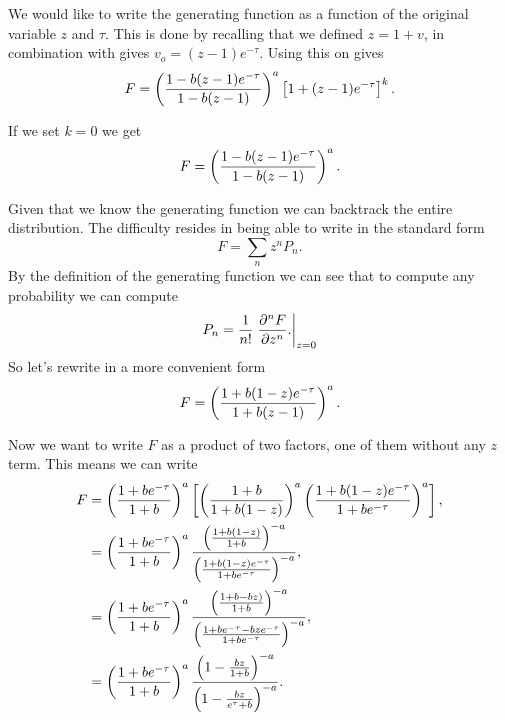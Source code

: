 We would like to write the generating function as a function of the original
variable $z$ and $\tau$. This is done by recalling that we defined $z = 1 + v$,
in combination with  gives $v_o = (z - 1) e^{-\tau}$.
Using this on  gives
\begin{equation}
  F = \left( {1 - b (z - 1) e^{-\tau}
  \over
  1 - b (z - 1)
  } \right)^a
  \left[ 1 + (z - 1) e^{-\tau} \right]^k.
\end{equation}

If we set $k = 0$ we get
\begin{equation}
  F = \left( {1 - b (z - 1) e^{-\tau}
  \over
  1 - b (z - 1)
  } \right)^a.
  \label{eq_generating_function_onz}
\end{equation}

Given that we know the generating function we can backtrack the entire
distribution. The difficulty resides in being able to write
 in the standard form
\begin{equation}
  F = \sum_{n} z^n P_n.
\end{equation}
By the definition of the generating function we can see that to compute any
probability we can compute
\begin{equation}
  P_n = {1 \over n!} \left. {\partial ^n F \over \partial z^n}.
  \right\rvert_{z=0}
\end{equation}
So let's rewrite  in a more convenient form
\begin{equation}
  F = \left( {1 + b (1 - z) e^{-\tau}
  \over
  1 + b (z - 1)
  }  \right)^a.
\end{equation}

Now we want to write $F$ as a product of two factors, one of them without any
$z$ term. This means we can write
\begin{align}
  F &= \left( {1 + b e^{-\tau} \over 1 + b } \right)^a
  \left[
  \left( {1 + b} \over 1 + b (1 - z) \right)^a
  \left( {1 + b (1 - z) e^{-\tau} \over 1 + b e^{-\tau}}  \right)^a
  \right], \\
  &= \left( {1 + b e^{-\tau} \over 1 + b } \right)^a
  { \left( {1 + b (1 - z) \over 1 + b} \right)^{-a}
  \over
  \left( {1 + b (1 - z) e^{-\tau} \over 1 + b e^{-\tau}} \right)^{-a}
  }, \\
  &= \left( {1 + b e^{-\tau} \over 1 + b } \right)^a
  { \left( {1 + b - b z) \over 1 + b} \right)^{-a}
  \over
  \left( {1 + b e^{-\tau} - b z e^{-\tau} \over 1 + b e^{-\tau}} \right)^{-a}
  }, \\
  &= \left( {1 + b e^{-\tau} \over 1 + b } \right)^a
  { \left( 1 - {b z \over 1 + b} \right)^{-a}
  \over
  \left( 1 - {b z \over e^{\tau} + b} \right)^{-a}
  }.
\end{align}
